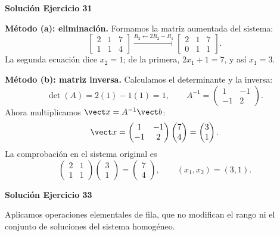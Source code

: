 \par\bigskip\noindent\textbf{Solución Ejercicio 31}\par\nobreak
\textbf{Método (a): eliminación.} Formamos la matriz aumentada del sistema:
\[
\left[\begin{array}{rr|r}2&1&7\\1&1&4\end{array}\right]\xrightarrow{R_2\leftarrow2R_2-R_1}\left[\begin{array}{rr|r}2&1&7\\0&1&1\end{array}\right].
\]
La segunda ecuación dice $x_2=1$; de la primera, $2x_1+1=7$, y así $x_1=3$.

\textbf{Método (b): matriz inversa.} Calculamos el determinante y la inversa:
\[
\det(A)=2(1)-1(1)=1,\qquad A^{-1}=\begin{pmatrix}1&-1\\-1&2\end{pmatrix}.
\]
Ahora multiplicamos $\vect x=A^{-1}\vect b$:
\[
\vect x=\begin{pmatrix}1&-1\\-1&2\end{pmatrix}\begin{pmatrix}7\\4\end{pmatrix}=\begin{pmatrix}3\\1\end{pmatrix}.
\]
La comprobación en el sistema original es
\[
\begin{pmatrix}2&1\\1&1\end{pmatrix}\begin{pmatrix}3\\1\end{pmatrix}=\begin{pmatrix}7\\4\end{pmatrix},\qquad\boxed{(x_1,x_2)=(3,1)}.
\]

\par\bigskip\noindent\textbf{Solución Ejercicio 33}\par\nobreak
Aplicamos operaciones elementales de fila, que no modifican el rango ni el conjunto de soluciones del sistema homogéneo.

